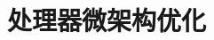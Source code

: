 \documentclass[../../main.tex]{subfiles}
\begin{document}
\chapter{处理器微架构优化}
\label{ch:05-microarch-optimization}






\end{document}
